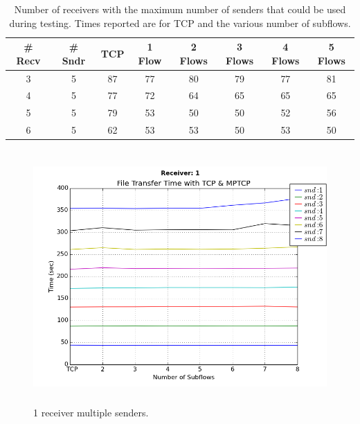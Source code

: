 \documentclass[10pt]{report}
\begin{document}
\begin{appendices}
  \begin{table}
    \captionsetup{width=0.8\textwidth}
    \begin{center}
      \begin{tabular}{|c|c|cccccc|}
        \hline
        \# Recv & \# Sndr & TCP & 1 Flow & 2 Flows & 3 Flows & 4 Flows & 5
        Flows \\
        \hline
        3 & 5 & 87 & 77 & 80 & 79 & 77 & 81 \\
        \hline
        4 & 5 & 77 & 72 & 64 & 65 & 65 & 65 \\
        \hline
        5 & 5 & 79 & 53 & 50 & 50 & 52 & 56 \\
        \hline
        6 & 5 & 62 & 53 & 53 & 50 & 53 & 50 \\
        \hline
      \end{tabular}
      \caption{Number of receivers with the maximum number of senders
        that could be used during testing. Times reported are for TCP
        and the various number of subflows.}
      \label{tab:times}
    \end{center}
  \end{table}

  \begin{figure}[!b]
    \includegraphics[width=\textwidth,height=3.8in]{images/rcv_1.png}
    \caption{1 receiver multiple senders.}
    \label{fig:rcv1}
  \end{figure}


\end{appendices}
\end{document}
